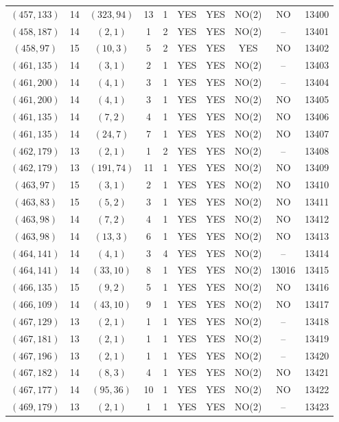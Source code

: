 \begin{longtable}{|c|c|c|c|c|c|c|c|c|c|}
$(457, 133)$ & 14 & $(323, 94)$ & 13 & 1 & YES & YES & NO(2) & NO & 13400\\
$(458, 187)$ & 14 & $(2, 1)$ & 1 & 2 & YES & YES & NO(2) & -- & 13401\\
$(458, 97)$ & 15 & $(10, 3)$ & 5 & 2 & YES & YES & YES & NO & 13402\\
$(461, 135)$ & 14 & $(3, 1)$ & 2 & 1 & YES & YES & NO(2) & -- & 13403\\
$(461, 200)$ & 14 & $(4, 1)$ & 3 & 1 & YES & YES & NO(2) & -- & 13404\\
$(461, 200)$ & 14 & $(4, 1)$ & 3 & 1 & YES & YES & NO(2) & NO & 13405\\
$(461, 135)$ & 14 & $(7, 2)$ & 4 & 1 & YES & YES & NO(2) & NO & 13406\\
$(461, 135)$ & 14 & $(24, 7)$ & 7 & 1 & YES & YES & NO(2) & NO & 13407\\
$(462, 179)$ & 13 & $(2, 1)$ & 1 & 2 & YES & YES & NO(2) & -- & 13408\\
$(462, 179)$ & 13 & $(191, 74)$ & 11 & 1 & YES & YES & NO(2) & NO & 13409\\
$(463, 97)$ & 15 & $(3, 1)$ & 2 & 1 & YES & YES & NO(2) & NO & 13410\\
$(463, 83)$ & 15 & $(5, 2)$ & 3 & 1 & YES & YES & NO(2) & NO & 13411\\
$(463, 98)$ & 14 & $(7, 2)$ & 4 & 1 & YES & YES & NO(2) & NO & 13412\\
$(463, 98)$ & 14 & $(13, 3)$ & 6 & 1 & YES & YES & NO(2) & NO & 13413\\
$(464, 141)$ & 14 & $(4, 1)$ & 3 & 4 & YES & YES & NO(2) & -- & 13414\\
$(464, 141)$ & 14 & $(33, 10)$ & 8 & 1 & YES & YES & NO(2) & 13016 & 13415\\
$(466, 135)$ & 15 & $(9, 2)$ & 5 & 1 & YES & YES & NO(2) & NO & 13416\\
$(466, 109)$ & 14 & $(43, 10)$ & 9 & 1 & YES & YES & NO(2) & NO & 13417\\
$(467, 129)$ & 13 & $(2, 1)$ & 1 & 1 & YES & YES & NO(2) & -- & 13418\\
$(467, 181)$ & 13 & $(2, 1)$ & 1 & 1 & YES & YES & NO(2) & -- & 13419\\
$(467, 196)$ & 13 & $(2, 1)$ & 1 & 1 & YES & YES & NO(2) & -- & 13420\\
$(467, 182)$ & 14 & $(8, 3)$ & 4 & 1 & YES & YES & NO(2) & NO & 13421\\
$(467, 177)$ & 14 & $(95, 36)$ & 10 & 1 & YES & YES & NO(2) & NO & 13422\\
$(469, 179)$ & 13 & $(2, 1)$ & 1 & 1 & YES & YES & NO(2) & -- & 13423\\

\end{longtable}
